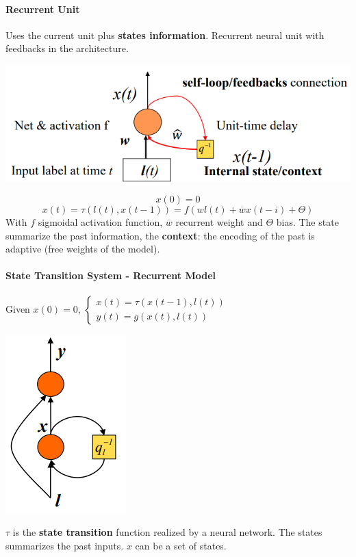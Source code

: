 \documentclass[10pt]{report}
\begin{document}
\paragraph{Recurrent Unit} Uses the current unit plus \textbf{states information}. Recurrent neural unit with feedbacks in the architecture.
\begin{center}
	\includegraphics[scale=0.5]{35.png}
\end{center}
$$x(0) = 0$$
$$x(t) = \tau(l(t),x(t-1)) = f(wl(t) + \overline{w}x(t-i) + \Theta)$$
With $f$ sigmoidal activation function, $\overline{w}$ recurrent weight and $\Theta$ bias. The state summarize the past information, the \textbf{context}: the encoding of the past is adaptive (free weights of the model).
\paragraph{State Transition System - Recurrent Model} Given $x(0) = 0$, $\left\{\begin{array}{l}
x(t) = \tau(x(t-1),l(t))\\
y(t) = g(x(t), l(t))
\end{array}\right.$
\begin{center}
	\includegraphics[scale=0.5]{36.png}
\end{center}
$\tau$ is the \textbf{state transition} function realized by a neural network. The states summarizes the past inputs. $x$ can be a set of states.
\end{document}

